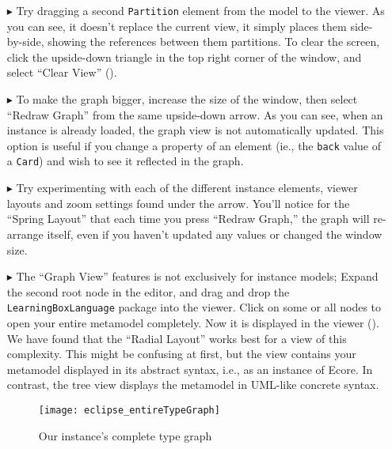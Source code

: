 \begin{itemize}
\clearpage

\item[$\blacktriangleright$] Try dragging a second \texttt{Partition} element from the model to the viewer. As you can see, it doesn't replace the current
view, it simply places them side-by-side, showing the references between them partitions. To clear the screen, click the upside-down triangle in the top
right corner of the window, and select ``Clear View'' ().

\item[$\blacktriangleright$] To make the graph bigger, increase the size of the window, then select ``Redraw Graph'' from the same upside-down arrow. As you can
see, when an instance is already loaded, the graph view is not automatically updated. This option is useful if you change a property of an element (ie., the
\texttt{back} value of a \texttt{Card}) and wish to see it reflected in the graph.

\item[$\blacktriangleright$] Try experimenting with each of the different instance elements, viewer layouts and zoom settings found under the arrow. You'll
notice for the ``Spring Layout'' that each time you press ``Redraw Graph,'' the graph will re-arrange itself, even if you haven't updated any values or changed the window size.

\item[$\blacktriangleright$] The ``Graph View'' features is not exclusively for instance models; Expand the second root node in the editor, and drag and
drop the \texttt{LearningBoxLanguage} package into the viewer. Click on some or all nodes to open your entire metamodel completely. Now it is displayed in the viewer
(). We have found that the ``Radial Layout'' works best for a view of this complexity. This might be confusing at first,
but the view contains your metamodel displayed in its abstract syntax, i.e., as an instance of Ecore. In contrast, the tree view displays the metamodel in UML-like
concrete syntax.

\vspace{1cm}

\begin{figure}[htbp]
	\centering
  \texttt{[image: eclipse\_entireTypeGraph]}
	\caption{Our instance's complete type graph}
	\label{eclipse:graphView_typeGraph}
\end{figure}


\end{itemize}
